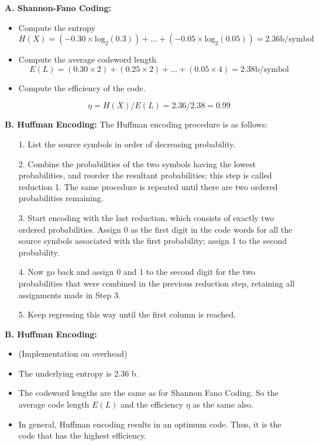 ﻿\documentclass[a4]{beamer}
\begin{document}
\medskip
\noindent \textbf{A. Shannon-Fano Coding:}
\begin{itemize}
\item Compute the entropy
\[H(X) = ( -0.30 \times \mbox{log}_2(0.3) ) +  \ldots +( -0.05 \times \mbox{log}_2(0.05)) = 2.36 \mbox{b/symbol} \]

\item Compute the average codeword length
\[E(L) = ( 0.30 \times 2 ) +( 0.25 \times 2)  + \ldots + ( 0.05 \times 4) = 2.38 \mbox{b/symbol} \]

\item Compute the efficiency of the code.

\[ \eta  = H(X) / E(L)  = 2.36 / 2.38  = 0.99 \]

\end{itemize}

\medskip\noindent \textbf{B. Huffman Encoding:}
 The Huffman encoding procedure is as follows:

\begin{itemize}\item[1.] List the source symbols in order of decreasing probability.
\item[2.] Combine the probabilities of the two symbols having the lowest probabilities, and reorder
the resultant probabilities; this step is called reduction 1. The same procedure is repeated until
there are two ordered probabilities remaining.
\item[3.] Start encoding with the last reduction, which consists of exactly two ordered probabilities. Assign
0 as the first digit in the code words for all the source symbols associated with the first probability;
assign 1 to the second probability.
\item[4.] Now go back and assign 0 and 1 to the second digit for the two probabilities that were combined
in the previous reduction step, retaining all assignments made in Step 3.
\item[5.] Keep regressing this way until the first column is reached.
\end{itemize}

\medskip\noindent \textbf{B. Huffman Encoding:}
\begin{itemize}
\item (Implementation on overhead)
\item The underlying entropy is 2.36 b.
\item The codeword lengths are the same as for Shannon Fano Coding. So the average code length $E(L)$ and the efficiency $\eta$ as the same also.
\item
In general, Huffman encoding results in an optimum code. Thus, it is the code that has the highest
efficiency.
\end{itemize}
\end{document}

